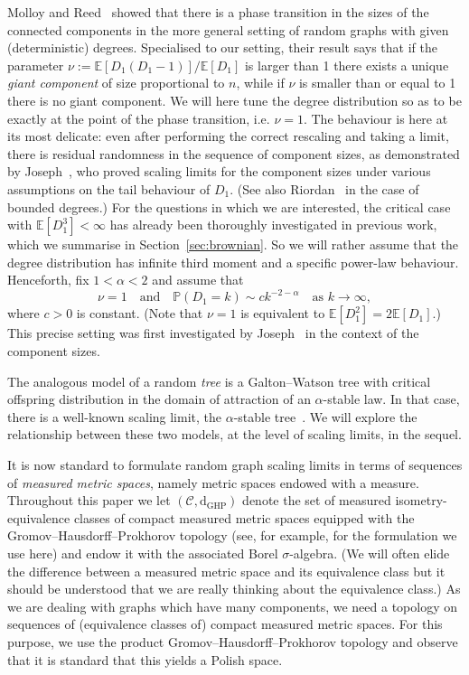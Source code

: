 \documentclass[AHL,Unicode,longabstracts,published]{cedram}
\newcommand{\E}[1]{\ensuremath{\mathbb{E} \left[#1 \right]}}
\newcommand{\Prob}[1]{\ensuremath{\mathbb{P} \left(#1 \right)}}
\newcommand{\GHP}{\mathrm{GHP}}
\newcommand{\rmd}{\mathrm{d}}
\newcommand{\scrC}{\mathscr{C}}
\newcommand{\bbE}{\mathbb{E}}
\begin{document}
Molloy and Reed~\cite{MolloyReed} showed that there is a phase transition in the sizes of the connected components in the more general setting of random graphs with given (deterministic) degrees. Specialised to our setting, their result says that if the parameter $\nu:=\bbE[D_1(D_1-1)]/\bbE[D_1]$ is larger than 1 there exists a unique \emph{giant component} of size proportional to $n$, while if $\nu$ is smaller than or equal to 1 there is no giant component. We will here tune the degree distribution so as to be exactly at the point of the phase transition, i.e. $\nu = 1$. The behaviour is here at its most delicate: even after performing the correct rescaling and taking a limit, there is residual randomness in the sequence of component sizes, as demonstrated by Joseph~\cite{Joseph14}, who proved scaling limits for the component sizes under various assumptions on the tail behaviour of $D_1$. (See also Riordan~\cite{Riordan12} in the case of bounded degrees.) For the questions in which we are interested, the critical case with $\E{D_1^3} < \infty$ has already been thoroughly investigated in previous work, which we summarise in Section~\ref{sec:brownian}. So we will rather assume that the degree distribution has infinite third moment and a specific power-law behaviour. Henceforth, fix $1 <\alpha <2$ and assume that
\begin{equation}\label{hyp:stable}
\nu = 1 \quad \text{and} \quad \Prob{D_1 = k} \sim c k^{-2-\alpha} \quad \text{as } k \to \infty,
\end{equation}
where $c > 0$ is constant. (Note that $\nu = 1$ is equivalent to $\E{D_1^2} = 2 \E{D_1}$.) This precise setting was first investigated by Joseph~\cite{Joseph14} in the context of the component sizes.

The analogous model of a random \emph{tree} is a Galton--Watson tree with critical offspring distribution in the domain of attraction of an $\alpha$-stable law. In that case, there is a well-known scaling limit, the $\alpha$-stable tree~\cite{Du03}. We will explore the relationship between these two models, at the level of scaling limits, in the sequel.

It is now standard to formulate random graph scaling limits in terms of sequences of \emph{measured metric spaces}, namely metric spaces endowed with a measure. Throughout this paper we let $(\scrC, \rmd_{\GHP})$ denote the set of measured isometry-equivalence classes of compact measured metric spaces equipped with the Gromov--Hausdorff--Prokhorov topology (see, for example, \cite[Section~2.1]{ABBrGoMi} for the formulation we use here) and endow it with the associated Borel $\sigma$-algebra. (We will often elide the difference between a measured metric space and its equivalence class but it should be understood that we are really thinking about the equivalence class.) As we are dealing with graphs which have many components, we need a topology on sequences of (equivalence classes of) compact measured metric spaces. For this purpose, we use the product Gromov--Hausdorff--Prokhorov topology and observe that it is standard that this yields a Polish space.
\end{document}
